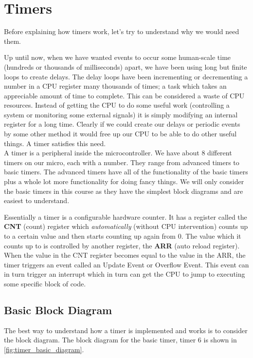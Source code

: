 \chapter{Timers}
Before explaining how timers work, let's try to understand why we would need them.

Up until now, when we have wanted events to occur some human-scale time (hundreds or thousands of milliseconds) apart, we have been using long but finite loops to create delays. 
The delay loops have been incrementing or decrementing a number in a CPU register many thousands of times; a task which takes an appreciable amount of time to complete. This can be considered a waste of CPU resources. Instead of getting the CPU to do some useful work (controlling a system or monitoring some external signals) it is simply modifying an internal register for a long time. 
Clearly if we could create our delays or periodic events by some other method it would free up our CPU to be able to do other useful things. 
A timer satisfies this need.\\


A timer is a peripheral inside the microcontroller. 
We have about 8 different timers on our micro, each with a number. 
They range from advanced timers to basic timers. 
The advanced timers have all of the functionality of the basic timers plus a whole lot more functionality for doing fancy things. 
We will only consider the basic timers in this course as they have the simplest block diagrams and are easiest to understand. 

Essentially a timer is a configurable hardware counter. It has a register called the \textbf{CNT} (count) register which \emph{automatically} (without CPU intervention) counts up to a certain value and then starts counting up again from 0. 
The value which it counts up to is controlled by another register, the \textbf{ARR} (auto reload register). 
When the value in the CNT register becomes equal to the value in the ARR, the timer triggers an event called an Update Event or Overflow Event.
This event can in turn trigger an interrupt which in turn can get the CPU to jump to executing some specific block of code. 

\section{Basic Block Diagram}
The best way to understand how a timer is implemented and works is to consider the block diagram. The block diagram for the basic timer, timer 6 is shown in \autoref{fig:timer_basic_diagram}.


